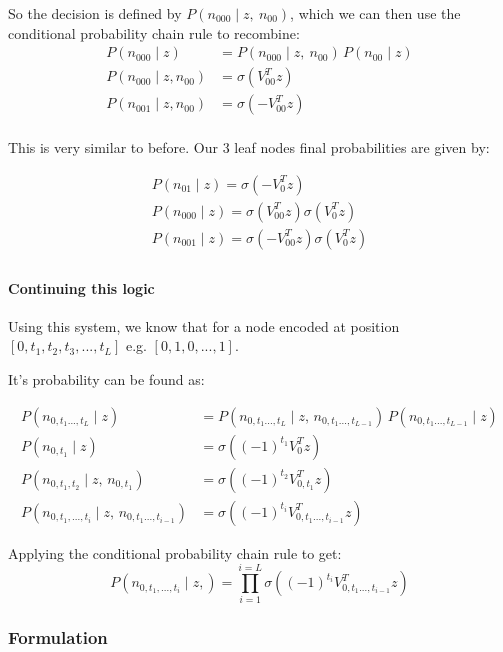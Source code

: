 \documentclass[parskip]{komatufte}
\begin{document}
So the decision is defined by $P(n_{000}\mid z,\:n_{00})$,
which we can then use the conditional probability chain rule to recombine:
\begin{align}
P(n_{000}\mid z)&=P(n_{000}\mid z,\:n_{00})\,P(n_{00}\mid z) \\
P(n_{000}\mid z,n_{00})&=\sigma(V_{00}^{T}z) \\
P(n_{001}\mid z,n_{00})&=\sigma(-V_{00}^{T}z) \\
\end{align}

This is very similar to before.
Our 3 leaf nodes final probabilities are given by:

\begin{align}
P(n_{01}\mid z)=\sigma(-V_{0}^{T}z) \\
P(n_{000}\mid z)=\sigma(V_{00}^{T}z)\sigma(V_{0}^{T}z) \\
P(n_{001}\mid z)=\sigma(-V_{00}^{T}z)\sigma(V_{0}^{T}z) \\
\end{align}

\paragraph{Continuing this logic}

Using this system,
we know that for a node encoded at position $[0,t_{1},t_{2},t_{3},...,t_{L}]$
e.g. $[0,1,0,...,1]$.

It's probability can be found as: 

\begin{align}
P(n_{0,t_{1}...,t_{L}}\mid z) &= P(n_{0,t_{1}...,t_{L}}\mid z,\,n_{0,t_{1}...,t_{L-1}})\,P(n_{0,t_{1}...,t_{L-1}}\mid z)\\
%
P(n_{0,t_{1}}\mid z)&=\sigma\left((-1)^{t_{1}}V_{0}^{T}z\right)\\
%
P(n_{0,t_{1},t_{2}}\mid z,\,n_{0,t_{1}})&=\sigma\left((-1)^{t_{2}}V_{0,t_{1}}^{T}z\right)\\
%
P(n_{0,t_{1},...,t_{i}}\mid z,\,n_{0,t_{1}...,t_{i-1}})&=\sigma\left((-1)^{t_{i}}V_{0,t_{1}...,t_{i-1}}^{T}z\right)
\end{align}

Applying the conditional probability chain rule to get:
\begin{equation}
P(n_{0,t_{1},...,t_{i}}\mid z,)=\prod_{i=1}^{i=L}\sigma\left((-1)^{t_{i}}V_{0,t_{1}...,t_{i-1}}^{T}z\right)
\end{equation}

\subsubsection{Formulation}
\end{document}
